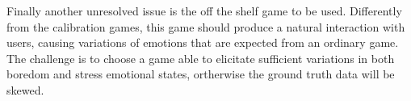 Finally another unresolved issue is the off the shelf game to be used. Differently from the calibration games, this game should produce a natural interaction with users, causing variations of emotions that are expected from an ordinary game. The challenge is to choose a game able to elicitate sufficient variations in both boredom and stress emotional states, ortherwise the ground truth data will be skewed.




